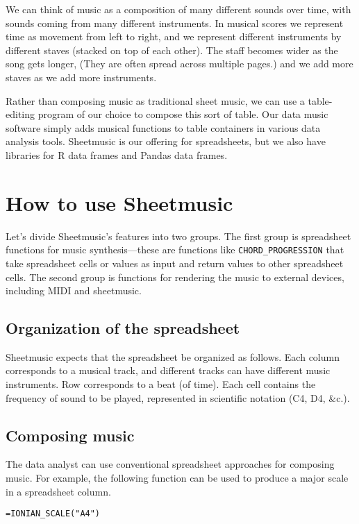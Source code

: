 \documentclass{acm_proc_article-sp}
\begin{document}
We can think of music as a composition of many different sounds over time,
with sounds coming from many different instruments. In musical scores
we represent time as movement from left to right, and we represent different
instruments by different staves (stacked on top of each other).
The staff becomes wider as the song gets longer, (They are often spread
across multiple pages.) and we add more staves as we add more instruments.

Rather than composing music as traditional sheet music,
we can use a table-editing program of our choice to compose
this sort of table. Our data music software simply adds
musical functions to table containers in various data analysis
tools. Sheetmusic is our offering for spreadsheets, but we
also have libraries for R data frames\cite{ddr} and Pandas
data frames.\cite{ddpy}

\section{How to use Sheetmusic}
Let's divide Sheetmusic's features into two groups. The first group
is spreadsheet functions for music synthesis---these are functions
like \texttt{CHORD_PROGRESSION} that take spreadsheet cells or values
as input and return values to other spreadsheet cells. The second
group is functions for rendering the music to external devices,
including MIDI and sheetmusic.

\subsection{Organization of the spreadsheet}
Sheetmusic expects that the spreadsheet be organized as follows.
Each column corresponds
to a musical track, and different tracks can have different music instruments.
Row corresponds to a beat (of time).
Each cell contains the frequency of sound to be played, represented
in scientific notation (C4, D4, \&c.).

\subsection{Composing music}
The data analyst can use conventional spreadsheet approaches for
composing music. For example, the following function can be used
to produce a major scale in a spreadsheet column.

\begin{verbatim}
=IONIAN_SCALE("A4")
\end{verbatim}
\end{document}
